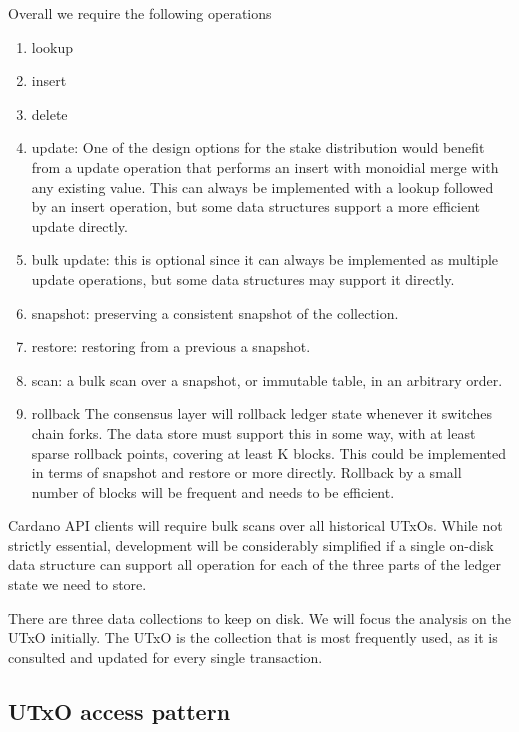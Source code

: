 \documentclass[11pt,a4paper]{article}
\begin{document}
Overall we require the following operations
\begin{enumerate}
  \item {\sc lookup}
  \item {\sc insert}
  \item {\sc delete}
  \item {\sc update}: One of the design options for the stake distribution
        would benefit from a update operation that performs an insert with
        monoidial merge with any existing value. This can always be implemented
        with a {\sc lookup} followed by an {\sc insert} operation, but some
        data structures support a more efficient {\sc update} directly.
  \item {\sc bulk update}: this is optional since it can always be implemented
        as multiple {\sc update} operations, but some data structures may
        support it directly.
  \item {\sc snapshot}: preserving a consistent snapshot of the collection.
  \item {\sc restore}: restoring from a previous a snapshot.
  \item {\sc scan}: a bulk scan over a snapshot, or immutable table, in an
        arbitrary order.
  \item {\sc rollback}
        \label{ROLLBACK}
        The consensus layer will rollback ledger state whenever it switches
        chain forks. The data store must support this in some way, with at
        least sparse rollback points, covering at least K blocks. This could
        be implemented in terms of {\sc snapshot} and {\sc restore} or more
        directly. Rollback by a small number of blocks will be frequent and
        needs to be efficient.


\end{enumerate}
Cardano API clients will require bulk {\sc scan}s over all historical UTxOs.
While not strictly essential, development will be considerably simplified if
a single on-disk data structure can support all operation for each of the
three parts of the ledger state we need to store.

There are three data collections to keep on disk. We will focus the analysis on
the UTxO initially. The UTxO is the collection that is most frequently used, as
it is consulted and updated for every single transaction.

\subsection{UTxO access pattern}
\label{utxo-access-pattern}
\end{document}

